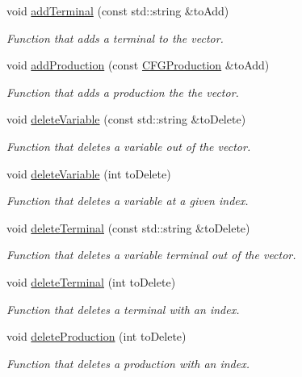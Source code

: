 \begin{DoxyCompactItemize}
void \hyperlink{classCFG_a53fb7ce08819bddc840bfc47ca5fd6d3}{add\+Terminal} (const std\+::string \&to\+Add)
\begin{DoxyCompactList}\small\item\em Function that adds a terminal to the vector. \end{DoxyCompactList}\item 
void \hyperlink{classCFG_abcb544cc6860ae5c3c6c53df8a6de848}{add\+Production} (const \hyperlink{classCFGProduction}{C\+F\+G\+Production} \&to\+Add)
\begin{DoxyCompactList}\small\item\em Function that adds a production the the vector. \end{DoxyCompactList}\item 
void \hyperlink{classCFG_a31abe7c6d17b7d71e1cd22cc57b4bc4d}{delete\+Variable} (const std\+::string \&to\+Delete)
\begin{DoxyCompactList}\small\item\em Function that deletes a variable out of the vector. \end{DoxyCompactList}\item 
void \hyperlink{classCFG_a8f1e0eec88b6a019c728bac520d18336}{delete\+Variable} (int to\+Delete)
\begin{DoxyCompactList}\small\item\em Function that deletes a variable at a given index. \end{DoxyCompactList}\item 
void \hyperlink{classCFG_a9d54aff45017bc0b4db3ec471d19cd5e}{delete\+Terminal} (const std\+::string \&to\+Delete)
\begin{DoxyCompactList}\small\item\em Function that deletes a variable terminal out of the vector. \end{DoxyCompactList}\item 
void \hyperlink{classCFG_aab9bd96ae82912ea2b20bcd1bfc82e14}{delete\+Terminal} (int to\+Delete)
\begin{DoxyCompactList}\small\item\em Function that deletes a terminal with an index. \end{DoxyCompactList}\item 
void \hyperlink{classCFG_a4552d136dbb7b8315e8cbc3f1dc1d26e}{delete\+Production} (int to\+Delete)
\begin{DoxyCompactList}\small\item\em Function that deletes a production with an index. \end{DoxyCompactList}\item 

\end{DoxyCompactItemize}
